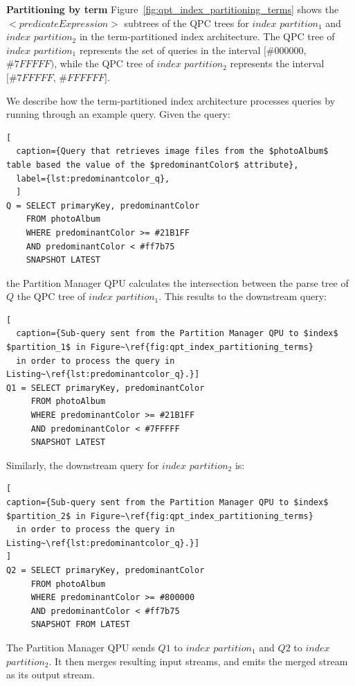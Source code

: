 \medskip
\noindent
\textbf{Partitioning by term}
Figure~\ref{fig:qpt_index_partitioning_terms} shows the $<predicateExpression>$ subtrees of the QPC trees
for $index$ $partition_1$ and $index$ $partition_2$ in the term-partitioned index architecture.
The QPC tree of $index$ $partition_1$ represents the set of queries in the interval $[\#000000$, $\#7FFFFF)$,
while the QPC tree of $index$ $partition_2$ represents the interval $[\#7FFFFF$, $\#FFFFFF]$.

We describe how the term-partitioned index architecture processes queries by running through an example query.
Given the query:

\begin{lstlisting}[
  caption={Query that retrieves image files from the $photoAlbum$ table based the value of the $predominantColor$ attribute},
  label={lst:predominantcolor_q},
  ]
Q = SELECT primaryKey, predominantColor
    FROM photoAlbum
    WHERE predominantColor >= #21B1FF
    AND predominantColor < #ff7b75
    SNAPSHOT LATEST
\end{lstlisting}

\noindent
the Partition Manager QPU calculates the intersection between the parse tree of $Q$ the QPC tree of $index$ $partition_1$.
This results to the downstream query:

\begin{lstlisting}[
  caption={Sub-query sent from the Partition Manager QPU to $index$ $partition_1$ in Figure~\ref{fig:qpt_index_partitioning_terms}
  in order to process the query in Listing~\ref{lst:predominantcolor_q}.}]
Q1 = SELECT primaryKey, predominantColor
     FROM photoAlbum
     WHERE predominantColor >= #21B1FF
     AND predominantColor < #7FFFFF
     SNAPSHOT LATEST
\end{lstlisting}

\noindent
Similarly, the downstream query for $index$ $partition_2$ is:

\begin{lstlisting}[
caption={Sub-query sent from the Partition Manager QPU to $index$ $partition_2$ in Figure~\ref{fig:qpt_index_partitioning_terms}
  in order to process the query in Listing~\ref{lst:predominantcolor_q}.}]
]
Q2 = SELECT primaryKey, predominantColor
     FROM photoAlbum
     WHERE predominantColor >= #800000
     AND predominantColor < #ff7b75
     SNAPSHOT FROM LATEST
\end{lstlisting}

\noindent
The Partition Manager QPU sends $Q1$ to $index$ $partition_1$ and $Q2$ to $index$ $partition_2$.
It then merges resulting input streams, and emits the merged stream as its output stream.

